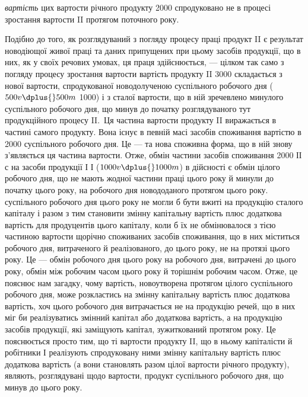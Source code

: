 \parcont{}  %
\emph{вартість} цих  вартости річного продукту \deq{} 2000 спродуковано не
в процесі зростання вартости II протягом поточного року.

Подібно до того, як розглядуваний з погляду процесу праці продукт
II є результат новодіющої живої праці та даних припущених при цьому
засобів продукції, що в них, як у своїх речових умовах, ця праця здійснюється,
— цілком так само з погляду процесу зростання вартости вартість
продукту II \deq{} 3000 складається з нової вартости, спродукованої новодолученою
 суспільного робочого дня ($500 v \dplus{} 500m$ \deq{} 1000) і з сталої
вартости, що в ній зречевлено  минулого суспільного робочого дня,
що минув до початку розглядуваного тут продукційного процесу II.~Ця
частина вартости продукту II виражається в частині самого продукту.
Вона існує в певній масі засобів споживання вартістю в 2000 \deq{}  суспільного
робочого дня. Це — та нова споживна форма, що в ній знову
з’являється ця частина вартости. Отже, обмін частини засобів споживання \deq{}
2000 ІІ $с$ на засоби продукції І \deq{} І ($1000 v \dplus{} 1000 m$) в дійсності є обмін
 цілого робочого дня, що не мають жодної частини праці цього року
й минули до початку цього року, на  робочого дня новододаного протягом
цього року.  суспільного робочого дня цього року не могли б
бути вжиті на продукцію сталого капіталу і разом з тим становити змінну
капітальну вартість плюс додаткова вартість для продуцентів цього капіталу,
коли б їх не обмінювалося з тією частиною вартости щорічно
споживаних засобів споживання, що в них міститься  робочого дня,
витраченого й реалізованого, до цього року, не на протязі цього
року. Це — обмін  робочого дня цього року на  робочого дня,
витрачені до цього року, обмін між робочим часом цього року й
торішнім робочим часом. Отже, це пояснює нам загадку, чому вартість,
новоутворена протягом цілого суспільного робочого дня, може розкластись
на змінну капітальну вартість плюс додаткова вартість, хоч
 цього робочого дня витрачається не на продукцію речей, що в
них міг би реалізуватись змінний капітал або додаткова вартість, а
на продукцію засобів продукції, які заміщують капітал, зужиткований
протягом року. Це пояснюється просто тим, що ті  вартости продукту
II, що в ньому капіталісти й робітники І реалізують спродуковану
ними змінну капітальну вартість плюс додаткова вартість (а вони
становлять разом  цілої вартости річного продукту), являють, розглядувані
щодо вартости, продукт  суспільного робочого дня, що
минув до цього року.

